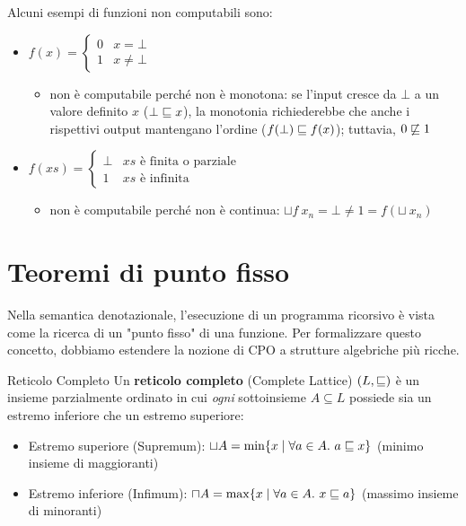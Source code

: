 Alcuni esempi di funzioni non computabili sono:
\begin{itemize}
    \item $
f(x) = \begin{cases}
    0 & x = \bot \\
    1 & x \neq \bot
\end{cases}
$
\begin{itemize}
    \item non è computabile perché non è monotona: se l'input cresce da $\bot$ a un valore definito $x$ ($\bot \sqsubseteq x$), la monotonia richiederebbe che anche i rispettivi output mantengano l'ordine ($f(\bot) \sqsubseteq f(x)$); tuttavia, $0 \not\sqsubseteq 1$
\end{itemize}

\item $
f(xs) = \begin{cases}
    \bot & xs \text{ è finita o parziale}\\
    1 & xs \text{ è infinita}
\end{cases}
$
\begin{itemize}
    \item non è computabile perché non è continua: $\sqcup f \ x_n = \bot \neq 1 = f(\sqcup \ x_n)$
\end{itemize}
\end{itemize}

\section{Teoremi di punto fisso}

Nella semantica denotazionale, l'esecuzione di un programma ricorsivo è vista come la ricerca di un "punto fisso" di una funzione. Per formalizzare questo concetto, dobbiamo estendere la nozione di CPO a strutture algebriche più ricche.

\begin{defframe}{Reticolo Completo}{}
    Un \textbf{reticolo completo} (Complete Lattice) $(L, \sqsubseteq)$ è un insieme parzialmente ordinato in cui \textit{ogni} sottoinsieme $A \subseteq L$ possiede sia un estremo inferiore che un estremo superiore:
    \begin{itemize}
        \item Estremo superiore (Supremum): $\sqcup A = \min \{ x \mid \forall a \in A.\ a \sqsubseteq x \}$ (minimo insieme di maggioranti)
        \item Estremo inferiore (Infimum): $\sqcap A = \max \{ x \mid \forall a \in A.\ x \sqsubseteq a \}$ (massimo insieme di minoranti)
    \end{itemize}
\end{defframe}

